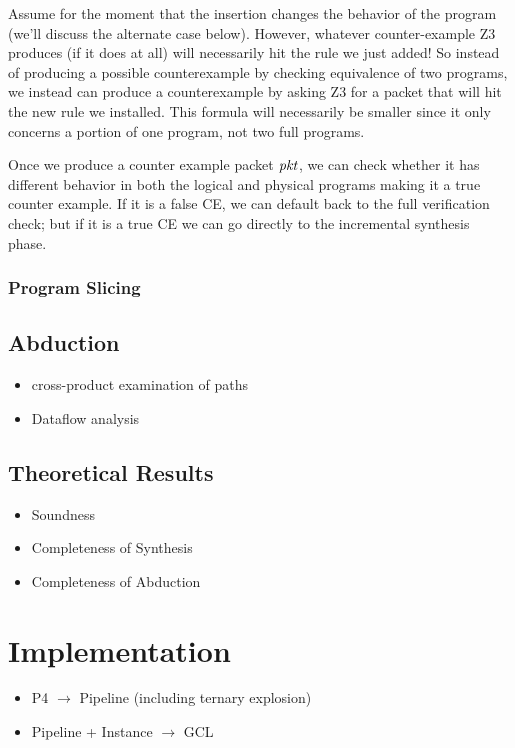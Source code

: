 Assume for the moment that the insertion changes the behavior of the
program (we'll discuss the alternate case below). However, whatever
counter-example Z3 produces (if it does at all) will necessarily hit
the rule we just added! So instead of producing a possible
counterexample by checking equivalence of two programs, we instead can
produce a counterexample by asking Z3 for a packet that will hit the
new rule we installed. This formula will necessarily be smaller since
it only concerns a portion of one program, not two full programs.

Once we produce a counter example packet $\mathit{pkt}$, we can check whether
it has different behavior in both the logical and physical programs
making it a true counter example. If it is a false CE, we can default
back to the full verification check; but if it is a true CE we can go
directly to the incremental synthesis phase.

\subsubsection{Program Slicing}




\subsection{Abduction}
\begin{itemize}
\item cross-product examination of paths
\item Dataflow analysis
\end{itemize}

\subsection{Theoretical Results}
\begin{itemize}
\item Soundness
\item Completeness of Synthesis
\item Completeness of Abduction
\end{itemize}

\section{Implementation}
\begin{itemize}
\item P4 $\to$ Pipeline (including ternary explosion)
\item Pipeline + Instance $\to$  GCL
\end{itemize}

